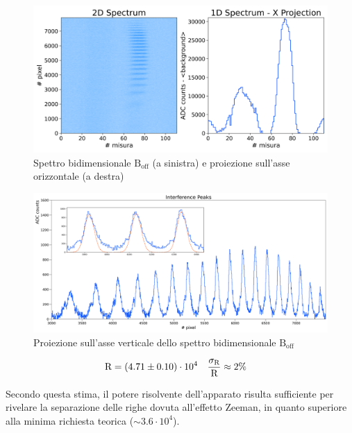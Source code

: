 \documentclass[twocolumn,10pt]{asme2ej}
\begin{document}
\begin{figure}
    \centering
    \includegraphics[width=\linewidth]{../Plots/Boff_2d_spectrum.png}
    \caption{Spettro bidimensionale $\text{B}_{\text{off}}$ (a sinistra) e proiezione sull'asse orizzontale (a destra)}
    \label{i:spettro2d_Boff}
    \vspace{-10pt}
\end{figure}

\begin{figure}
    \centering
    \includegraphics[width=\textwidth]{../Plots/Boff_Y_proj.png}
   \caption{Proiezione sull'asse verticale dello spettro bidimensionale $\text{B}_{\text{off}}$}
    \label{i:spettro2d_Boff_ProjY}
\end{figure}

\vspace{-15pt}
\begin{align*}
    \text{R} &= (4.71 \pm 0.10)\cdot 10^4  & \frac{\sigma_{\text{R}}}{\text{R}} &\approx 2\%
    \label{e:R_result}
    \vspace{-10pt}
\end{align*}


Secondo questa stima, il potere risolvente dell'apparato risulta sufficiente per rivelare la separazione delle righe
dovuta all'effetto Zeeman, in quanto superiore alla minima richiesta teorica ($\sim 3.6 \cdot 10^4$). 
\end{document}
